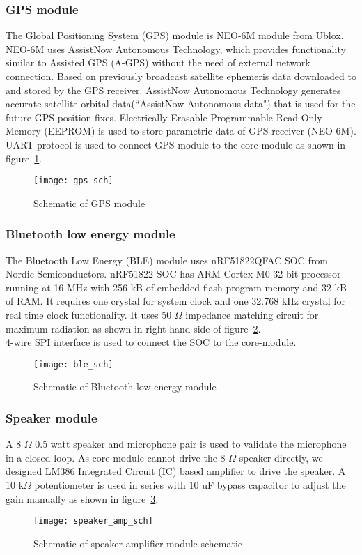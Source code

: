 \subsubsection{GPS module}
The Global Positioning System (GPS) module is NEO-6M module from Ublox. NEO-6M uses AssistNow Autonomous Technology,  which provides functionality similar to Assisted GPS (A-GPS) without the need of external network connection. Based on previously broadcast satellite ephemeris data downloaded to and stored by the GPS receiver. AssistNow Autonomous Technology generates accurate satellite orbital data(``AssistNow Autonomous data") that is used for the future GPS position fixes. Electrically Erasable Programmable Read-Only Memory (EEPROM) is used to store parametric data of GPS receiver (NEO-6M).
UART protocol is used to connect GPS module to the core-module as shown in figure~\ref{fig:gps_sch}.    %
\begin{figure}[H]
\texttt{[image: gps\_sch]}
\caption{Schematic of GPS module}
\label{fig:gps_sch}
\end{figure}

\subsubsection{Bluetooth low energy module}
The Bluetooth Low Energy (BLE) module uses nRF51822QFAC SOC from Nordic Semiconductors. nRF51822 SOC has ARM\textsuperscript{\textregistered} Cortex\textsuperscript{\texttrademark}-M0 32-bit processor running at 16 MHz with 256 kB of embedded flash program memory and 32 kB of RAM. It requires one crystal for system clock and one 32.768 kHz crystal for real time clock functionality. It uses 50 $\Omega$ impedance matching circuit for maximum radiation as shown in right hand side of figure~\ref{fig:ble_sch}.\\
4-wire SPI interface is used to connect the SOC to the core-module. 
\begin{figure}[H]
\texttt{[image: ble\_sch]}
\caption{Schematic of Bluetooth low energy module}
\label{fig:ble_sch}
\end{figure}

\subsubsection{Speaker module}
A 8 $\Omega$ 0.5 watt speaker and microphone pair is used to validate the microphone in a closed loop. As core-module cannot drive the 8 $\Omega$ speaker directly, we designed LM386 Integrated Circuit (IC) based amplifier to drive the speaker. A 10 k$\Omega$ potentiometer is used in series with 10 uF bypass capacitor to adjust the gain manually as shown in figure~\ref{fig:speaker_amp_sch}.
\begin{figure}[H]
\texttt{[image: speaker\_amp\_sch]}
\caption{Schematic of speaker amplifier module schematic}
\label{fig:speaker_amp_sch}
\end{figure}

